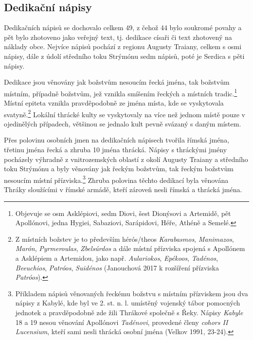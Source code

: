 
\subsection[dedikační-nápisy-13]{Dedikační nápisy}

Dedikačních nápisů se dochovalo celkem 49, z čehož 44 bylo soukromé povahy a pět bylo zhotoveno jako veřejný text, tj. dedikace císaři či text zhotovený na náklady obce. Nejvíce nápisů pochází z regionu Augusty Traiany, celkem s osmi nápisy, dále z údolí středního toku Strýmónu sedm nápisů, poté je Serdica s pěti nápisy.

Dedikace jsou věnovány jak božstvům nesoucím řecká jména, tak božstvům místním, případně božstvům, jež vznikla smíšením řeckých a místních tradic.\footnote{Objevuje se osm Asklépiovi, sedm Diovi, šest Dionýsovi a Artemidě, pět Apollónovi, jedna Hygiei, Sabaziovi, Sarápidovi, Héře, Athéně a Semelé.} Místní epiteta vznikla pravděpodobně ze jména místa, kde se vyskytovala svatyně.\footnote{Z místních božstev je to především hérós/theos {\em Karabasmos}, {\em Manimazos}, {\em Marón}, {\em Pyrmeroulas}, {\em Zbelsúrdos} a dále místní přízviska spojená s Apollónem a Asklépiem a Artemidou, jako např. {\em Aulariokos}, {\em Epékoos}, {\em Tadénos}, {\em Beeuchios}, {\em Patróos}, {\em Suidénos} (Janouchová 2017 k rozšíření přízviska {\em Patróos}).} Lokální thrácké kulty se vyskytovaly na více než jednom místě pouze v ojedinělých případech, většinou se jednalo kult pevně svázaný s daným místem.

Přes polovinu osobních jmen na dedikačních nápisech tvořila římská jména, třetinu jména řecká a zhruba 10  jména thrácká. Nápisy s thráckými jmény pocházely výhradně z vnitrozemských oblastí z okolí Augusty Traiany a středního toku Strýmónu a byly věnovány jak řeckým božstvům, tak řeckým božstvům nesoucím místní přízviska.\footnote{Příkladem nápisů věnovaných řeckému božstvu s místním přízviskem jsou dva nápisy z Kabylé, kde byl ve 2. st. n. l. umístěný vojenský tábor pomocných jednotek a pravděpodobně zde žili Thrákové společně s Řeky. Nápisy {\em Kabyle} 18 a 19 nesou věnování Apollónovi {\em Tadénovi}, provedené členy {\em cohors II Lucensium}, kteří sami nesli thrácká osobní jména (Velkov 1991, 23-24).} Zhruba polovina těchto dedikací byla věnována Thráky sloužícími v římské armádě, kteří zároveň nesli římská a thrácká jména.

